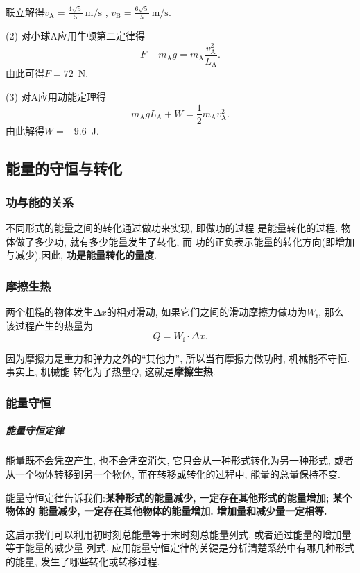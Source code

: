 \documentclass[11pt,a4paper]{ctexart}
\begin{document}
联立解得$v_\mathrm{A} = \displaystyle\frac{4\sqrt{5}}{5}\ \mathrm{m/s}$
, $v_\mathrm{B} = \displaystyle\frac{6\sqrt{5}}{5}\ \mathrm{m/s}$.

\setlength{\abovedisplayskip}{3pt}
\setlength{\belowdisplayskip}{3pt}

(2) 对小球A应用牛顿第二定律得
$$F - m_\mathrm{A}g = m_\mathrm{A}\frac{v_\mathrm{A}^2}{L_\mathrm{A}}.$$
由此可得$F= 72$\ N.

(3) 对A应用动能定理得$$m_\mathrm{A}gL_\mathrm{A} + W = \frac12 m_\mathrm{A}v^2_\mathrm{A}.$$
由此解得$W = -9.6$\ J.

\subsection{能量的守恒与转化}

\subsubsection{功与能的关系}

不同形式的能量之间的转化通过做功来实现, 即做功的过程
是能量转化的过程. 物体做了多少功, 就有多少能量发生了转化, 而
功的正负表示能量的转化方向(即增加与减少).因此, \textbf{功是能量转化的量度}.

\subsubsection{摩擦生热}

两个粗糙的物体发生$\Delta x$的相对滑动, 如果它们之间的滑动摩擦力做功为$W_\mathrm{f}$, 那么
该过程产生的热量为$$Q = W_\mathrm{f} \cdot \Delta x.$$

因为摩擦力是重力和弹力之外的``其他力'', 所以当有摩擦力做功时, 机械能不守恒. 事实上, 机械能
转化为了热量$Q$, 这就是\textbf{摩擦生热}.

\subsubsection{能量守恒}

\subparagraph{能量守恒定律} 能量既不会凭空产生, 也不会凭空消失, 它只会从一种形式转化为另一种形式,
或者从一个物体转移到另一个物体, 而在转移或转化的过程中, 能量的总量保持不变.

能量守恒定律告诉我们:\textbf{某种形式的能量减少, 一定存在其他形式的能量增加; 某个物体的
	能量减少, 一定存在其他物体的能量增加. 增加量和减少量一定相等.}

这启示我们可以利用初时刻总能量等于末时刻总能量列式, 或者通过能量的增加量等于能量的减少量
列式. 应用能量守恒定律的关键是分析清楚系统中有哪几种形式的能量, 发生了哪些转化或转移过程.\\
\end{document}
